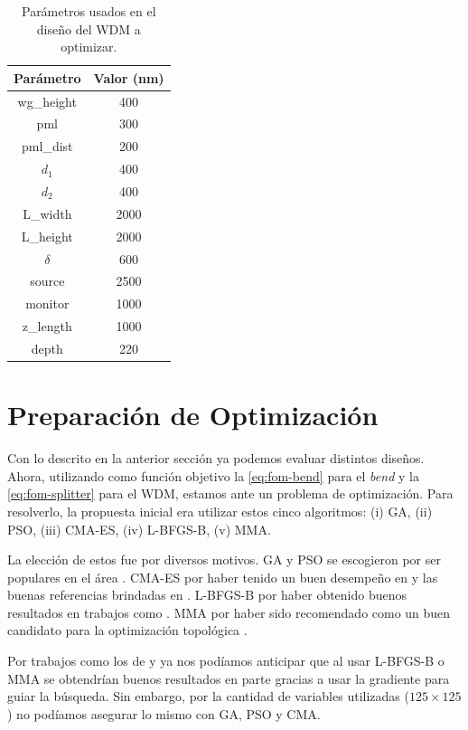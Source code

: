 \begin{table}[ht]
    \centering
    \begin{tabular}{|c|c|}
    \hline 
    Parámetro &  Valor (nm) \\
    \hline 
    wg\_height & 400 \\
    pml & 300 \\
    pml\_dist & 200 \\
    $d_1$ & 400 \\
    $d_2$ & 400 \\
    L\_width & 2000 \\
    L\_height & 2000 \\
    $\delta$ & 600 \\
    source & 2500 \\
    monitor & 1000 \\
    z\_length & 1000 \\
    depth & 220 \\
    \hline 
    \end{tabular}
    \caption{Parámetros usados en el diseño del WDM a optimizar.}
    \label{tab:wdm-values}
\end{table}


\section{Preparación de Optimización}

Con lo descrito en la anterior sección ya podemos evaluar distintos diseños.
Ahora, utilizando como función objetivo la \autoref{eq:fom-bend} para el \emph{bend} y 
la \autoref{eq:fom-splitter} para el WDM,
estamos ante un problema de optimización.
Para resolverlo, la propuesta inicial era utilizar estos cinco algoritmos:
(i) GA, (ii) PSO, (iii) CMA-ES, (iv) L-BFGS-B, (v) MMA.

La elección de estos fue por diversos motivos.
GA y PSO se escogieron por ser populares en el área \citep{Elsawy2020, Molesky2018, Prosopio-Galarza2019}.
CMA-ES por haber tenido un buen desempeño en \cite{Gregory2015} y las buenas referencias brindadas en
\cite{Campbell2019}.
L-BFGS-B por haber obtenido buenos resultados en trabajos como \cite{Su2020}.
MMA por haber sido recomendado como un buen candidato para la optimización topológica \citep{Christiansen2021}.

Por trabajos como los de \cite{Su2020} y \cite{Christiansen2021} ya nos podíamos anticipar que al usar
L-BFGS-B o MMA se obtendrían buenos resultados en parte gracias a usar la gradiente para guiar la búsqueda.
Sin embargo, por la cantidad de variables utilizadas ($125 \times 125$) no podíamos asegurar lo mismo
con GA, PSO y CMA. 

